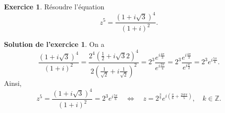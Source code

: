 \documentclass[a4paper, 11pt,openany]{article}%
\theoremstyle{plain}
\theoremstyle{definition}
\newtheorem{exo}{Exercice}
\newtheorem{sol}{Solution de l'exercice}
\theoremstyle{remark}
\newcommand{\Z}{\mathbb{Z}}
\begin{document}
\begin{exo}
Résoudre l'équation
\[ z^5 = \frac{(1+i \sqrt{3})^4}{(1+i)^2}.\]
\end{exo}
%
\begin{sol}
 On a 
 \[ \frac{(1+i \sqrt{3})^4}{(1+i)^2} = \frac{2^4 \left( \frac{1}{2} + i \sqrt{3}{2} \right)^4}{2 \left( \frac{1}{\sqrt{2}} + i \frac{1}{\sqrt{2}} \right)^2} = 2^3 \frac{e^{i \frac{4\pi}{3}}}{e^{i \frac{2\pi}{4}}}= 2^3 \frac{e^{i \frac{4\pi}{3}}}{e^{i \frac{\pi}{2}}} = 2^3 e^{i \frac{5 \pi}{6}}.\]
  Ainsi,
 \[ z^5 =  \frac{(1+i \sqrt{3})^4}{(1+i)^2} =2^3 e^{i \frac{5 \pi}{6}} \quad \Leftrightarrow \quad  z=2^{\frac{3}{5}} e^{i\left(\frac{\pi}{6} + \frac{2ik \pi}{5} \right)}, \quad  k\in \Z.\]
\end{sol}
\end{document}
